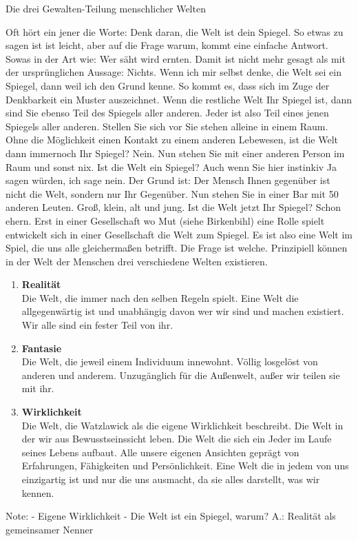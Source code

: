 Die drei Gewalten-Teilung menschlicher Welten

Oft hört ein jener die Worte: Denk daran, die Welt ist dein Spiegel. So etwas zu sagen ist ist leicht, aber auf die Frage warum, kommt eine einfache Antwort.
Sowas in der Art wie: Wer säht wird ernten. Damit ist nicht mehr gesagt als mit der ursprünglichen Aussage: Nichts. Wenn ich mir selbst denke, die Welt sei ein Spiegel,
dann weil ich den Grund kenne. So kommt es, dass sich im Zuge der Denkbarkeit ein Muster auszeichnet. Wenn die restliche Welt Ihr Spiegel ist, dann sind Sie ebenso
Teil des Spiegels aller anderen. Jeder ist also Teil eines jenen Spiegels aller anderen. Stellen Sie sich vor Sie stehen alleine in einem Raum. Ohne die Möglichkeit einen
Kontakt zu einem anderen Lebewesen, ist die Welt dann immernoch Ihr Spiegel? Nein. Nun stehen Sie mit einer anderen Person im Raum und sonst nix. Ist die Welt ein Spiegel?
Auch wenn Sie hier instinkiv Ja sagen würden, ich sage nein. Der Grund ist: Der Mensch Ihnen gegenüber ist nicht die Welt, sondern nur Ihr Gegenüber. Nun stehen Sie in einer
Bar mit 50 anderen Leuten. Groß, klein, alt und jung. Ist die Welt jetzt Ihr Spiegel? Schon ehern. Erst in einer Gesellschaft wo Mut (siehe Birkenbihl) eine Rolle spielt entwickelt
sich in einer Gesellschaft die Welt zum Spiegel. Es ist also eine Welt im Spiel, die uns alle gleichermaßen betrifft. Die Frage ist welche. Prinzipiell können in der Welt der Menschen
drei verschiedene Welten existieren.
\begin{enumerate}
    \item \textbf{Realität}\\
    Die Welt, die immer nach den selben Regeln spielt. Eine Welt die allgegenwärtig ist und unabhängig davon wer wir sind und machen existiert. Wir alle sind ein fester Teil von ihr.
    \item \textbf{Fantasie}\\
    Die Welt, die jeweil einem Individuum innewohnt. Völlig losgelöst von anderen und anderem. Unzugänglich für die Außenwelt, außer wir teilen sie mit ihr.
    \item \textbf{Wirklichkeit}\\
    Die Welt, die Watzlawick als die eigene Wirklichkeit beschreibt. Die Welt in der wir aus Bewusstseinssicht leben. Die Welt die sich ein Jeder im Laufe seines Lebens aufbaut.
    Alle unsere eigenen Ansichten geprägt von Erfahrungen, Fähigkeiten und Persönlichkeit. Eine Welt die in jedem von uns einzigartig ist und nur die uns ausmacht, da sie alles 
    darstellt, was wir kennen.
\end{enumerate}









Note:
- Eigene Wirklichkeit
- Die Welt ist ein Spiegel, warum? A.: Realität als gemeinsamer Nenner
